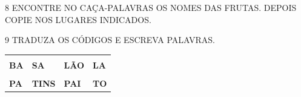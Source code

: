 \begin{escola}






\num{8} ENCONTRE NO CAÇA-PALAVRAS OS NOMES DAS FRUTAS. DEPOIS COPIE NOS LUGARES INDICADOS.










\num{9} TRADUZA OS CÓDIGOS E ESCREVA PALAVRAS.

\begin{longtable}[]{@{}llll@{}}
\toprule
& & &\tabularnewline
\textbf{BA} & \textbf{SA} & \textbf{LÃO} & \textbf{LA}\tabularnewline
& & &\tabularnewline
\textbf{PA} & \textbf{TINS} & \textbf{PAI} & \textbf{TO}\tabularnewline
\bottomrule
\end{longtable}


\end{escola}
